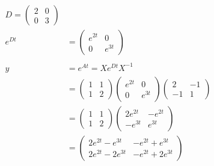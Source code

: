 \documentclass{article}
\begin{document}
\begin{align*}
    D = \begin{pmatrix} 2 & 0 \\ 0 & 3 \end{pmatrix} \\
    e^{Dt} &= \begin{pmatrix} e^{2t} & 0 \\ 0 & e^{3t} \end{pmatrix} \\
    \\
    y &= e^{At} = X e^{Dt} X^{-1} \\
    &= \begin{pmatrix} 1 & 1 \\ 1 & 2 \end{pmatrix} \begin{pmatrix} e^{2t} & 0 \\ 0 & e^{3t} \end{pmatrix} \begin{pmatrix} 2 & -1 \\ -1 & 1 \end{pmatrix} \\
    &= \begin{pmatrix} 1 & 1 \\ 1 & 2 \end{pmatrix} \begin{pmatrix} 2e^{2t} & -e^{2t} \\ -e^{3t} & e^{3t} \end{pmatrix} \\
    &= \begin{pmatrix} 2e^{2t} - e^{3t} & -e^{2t} + e^{3t} \\ 2e^{2t} - 2e^{3t} & -e^{2t} + 2e^{3t} \end{pmatrix} \\
\end{align*}
\end{document}
